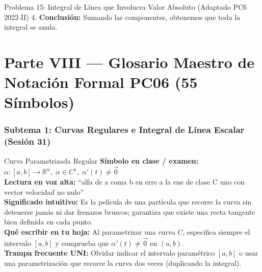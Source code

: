 \documentclass[11pt,a4paper]{article}
\begin{document}
\begin{ejerciciobox}{Problema 15: Integral de Línea que Involucra Valor Absoluto (Adaptado PC6 2022-II)}
4. \textbf{Conclusión:}
Sumando las componentes, obtenemos que toda la integral se anula.
\end{ejerciciobox}


\newpage
\part*{Parte VIII --- Glosario Maestro de Notación Formal PC06 (55 Símbolos)}

\section{Subtema 1: Curvas Regulares e Integral de Línea Escalar (Sesión 31)}

\begin{definicionbox}{Curva Parametrizada Regular}
\textbf{Símbolo en clase / examen:} $\alpha : [a, b] \to \mathbb{R}^n,\; \alpha \in C^1,\; \alpha'(t) \neq \vec{0}$\\[0.15cm]
\textbf{Lectura en voz alta:} ``alfa de a coma b en erre a la ene de clase C uno con vector velocidad no nulo''\\[0.12cm]
\textbf{Significado intuitivo:} Es la película de una partícula que recorre la curva sin detenerse jamás ni dar frenazos bruscos; garantiza que existe una recta tangente bien definida en cada punto.\\[0.12cm]
\textbf{Qué escribir en tu hoja:} Al parametrizar una curva $C$, especifica siempre el intervalo $[a,b]$ y comprueba que $\alpha'(t) \neq \vec{0}$ en $(a,b)$.\\[0.12cm]
\textbf{Trampa frecuente UNI:} Olvidar indicar el intervalo paramétrico $[a,b]$ o usar una parametrización que recorre la curva dos veces (duplicando la integral).
\end{definicionbox}
\end{document}
